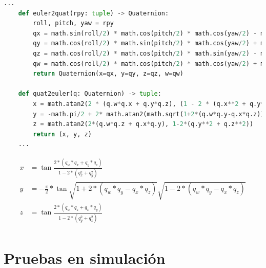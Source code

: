 \begin{code}[h!]
  \begin{lstlisting}[language=Python]
    ...
    def euler2quat(rpy: tuple) -> Quaternion:
        roll, pitch, yaw = rpy
        qx = math.sin(roll/2) * math.cos(pitch/2) * math.cos(yaw/2) - math.cos(roll/2) * math.sin(pitch/2) * math.sin(yaw/2)
        qy = math.cos(roll/2) * math.sin(pitch/2) * math.cos(yaw/2) + math.sin(roll/2) * math.cos(pitch/2) * math.sin(yaw/2)
        qz = math.cos(roll/2) * math.cos(pitch/2) * math.sin(yaw/2) - math.sin(roll/2) * math.sin(pitch/2) * math.cos(yaw/2)
        qw = math.cos(roll/2) * math.cos(pitch/2) * math.cos(yaw/2) + math.sin(roll/2) * math.sin(pitch/2) * math.sin(yaw/2)
        return Quaternion(x=qx, y=qy, z=qz, w=qw)

    def quat2euler(q: Quaternion) -> tuple:
        x = math.atan2(2 * (q.w*q.x + q.y*q.z), (1 - 2 * (q.x**2 + q.y**2)))
        y = -math.pi/2 + 2* math.atan2(math.sqrt(1+2*(q.w*q.y-q.x*q.z)), math.sqrt(1-2*(q.w*q.y-q.x*q.z)))
        z = math.atan2(2*(q.w*q.z + q.x*q.y), 1-2*(q.y**2 + q.z**2))
        return (x, y, z)
    ...
  \end{lstlisting}
\caption[Funciones matemáticas del módulo \texttt{geom\_utils.py}]{Funciones matemáticas del módulo \texttt{geom\_utils.py}}
\label{cod:geom_utils}
\end{code}

\begin{myequation}[h!]
  \begin{equation}
  \begin{aligned}
  x &= \tan{\frac{2 * (q_w*q_x + q_y*q_z)}{1 - 2 * (q_x^2 + q_y^2)}}  \\
  y &= -\frac{\pi}{2} * \tan{\sqrt{1 + 2 * (q_w * q_y - q_x * q_z)}}{\sqrt{1 - 2 * (q_w * q_y - q_x * q_z)}}  \\
  z &= \tan{\frac{2 * (q_w * q_z + q_x * q_y)}{1 - 2 * (q_y^2 + q_z^2)}}  \\
  \end{aligned}
  \label{ec:euler_to_quat}
  \end{equation}
  \caption[Obtención de ángulos de Euler (RPY) a partir de Cuaterniones]{Obtención de ángulos de Euler (RPY) a partir de Cuaterniones}
\end{myequation}



\section{Pruebas en simulación}
\label{sec:pruebas_sim}

